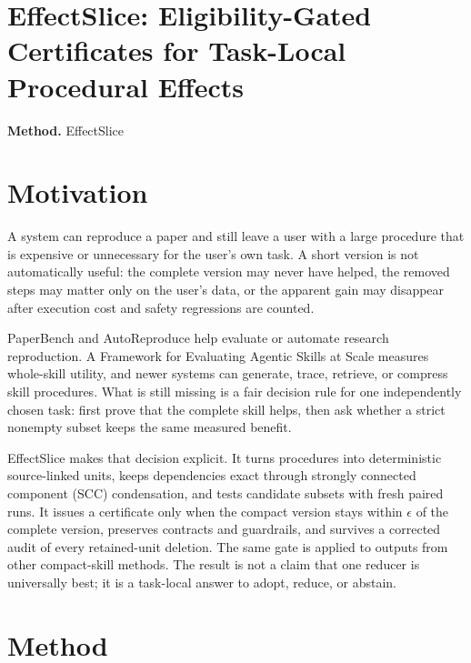 \documentclass[10pt,a4paper]{article}
\begin{document}
\section*{EffectSlice: Eligibility-Gated Certificates for Task-Local Procedural Effects}
\textbf{Method.} EffectSlice
\section*{Motivation}
A system can reproduce a paper and still leave a user with a large procedure that is expensive or unnecessary for the user's own task. A short version is not automatically useful: the complete version may never have helped, the removed steps may matter only on the user's data, or the apparent gain may disappear after execution cost and safety regressions are counted.

PaperBench and AutoReproduce help evaluate or automate research reproduction. A Framework for Evaluating Agentic Skills at Scale measures whole-skill utility, and newer systems can generate, trace, retrieve, or compress skill procedures. What is still missing is a fair decision rule for one independently chosen task: first prove that the complete skill helps, then ask whether a strict nonempty subset keeps the same measured benefit.

EffectSlice makes that decision explicit. It turns procedures into deterministic source-linked units, keeps dependencies exact through strongly connected component (SCC) condensation, and tests candidate subsets with fresh paired runs. It issues a certificate only when the compact version stays within \(\epsilon \) of the complete version, preserves contracts and guardrails, and survives a corrected audit of every retained-unit deletion. The same gate is applied to outputs from other compact-skill methods. The result is not a claim that one reducer is universally best;\allowbreak{} it is a task-local answer to adopt, reduce, or abstain.
\section*{Method}
\end{document}
